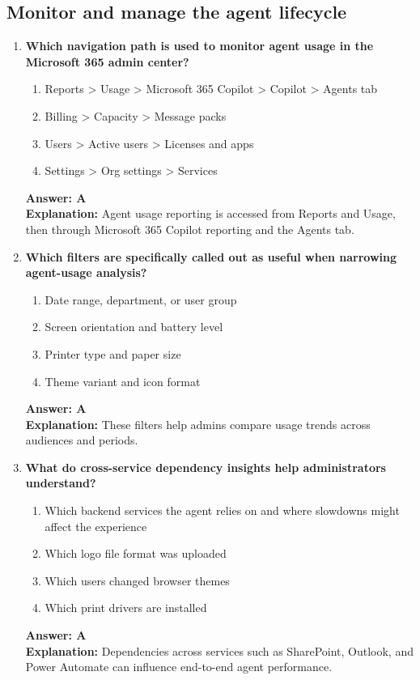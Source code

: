 \documentclass[10pt]{article}
\begin{document}
\clearpage
\subsection{Monitor and manage the agent lifecycle}
\begin{enumerate}[leftmargin=*]

\item \textbf{Which navigation path is used to monitor agent usage in the Microsoft 365 admin center?}
\begin{enumerate}[label=\Alph*.]
  \item Reports > Usage > Microsoft 365 Copilot > Copilot > Agents tab
  \item Billing > Capacity > Message packs
  \item Users > Active users > Licenses and apps
  \item Settings > Org settings > Services
\end{enumerate}
\textbf{Answer: A}\\
\textbf{Explanation:} Agent usage reporting is accessed from Reports and Usage, then through Microsoft 365 Copilot reporting and the Agents tab.

\item \textbf{Which filters are specifically called out as useful when narrowing agent-usage analysis?}
\begin{enumerate}[label=\Alph*.]
  \item Date range, department, or user group
  \item Screen orientation and battery level
  \item Printer type and paper size
  \item Theme variant and icon format
\end{enumerate}
\textbf{Answer: A}\\
\textbf{Explanation:} These filters help admins compare usage trends across audiences and periods.

\item \textbf{What do cross-service dependency insights help administrators understand?}
\begin{enumerate}[label=\Alph*.]
  \item Which backend services the agent relies on and where slowdowns might affect the experience
  \item Which logo file format was uploaded
  \item Which users changed browser themes
  \item Which print drivers are installed
\end{enumerate}
\textbf{Answer: A}\\
\textbf{Explanation:} Dependencies across services such as SharePoint, Outlook, and Power Automate can influence end-to-end agent performance.


\end{enumerate}
\end{document}
